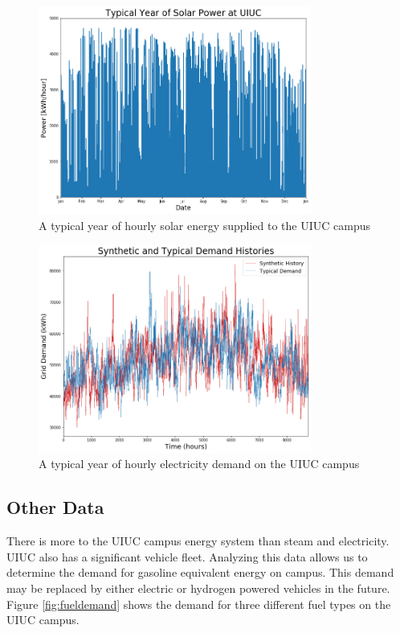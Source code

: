 \begin{figure}[H]
  \centering
  \includegraphics[width=0.8\textwidth]{typicalsolar}
  \caption{A typical year of hourly solar energy supplied to the UIUC campus}
  \label{fig:typsol}
\end{figure}


\begin{figure}[H]
  \centering
  \includegraphics[width=0.8\textwidth]{syntypdemand}
  \caption{A typical year of hourly electricity demand on the UIUC campus}
  \label{fig:synelc}
\end{figure}

\subsection{Other Data}
There is more to the UIUC campus energy system than steam and electricity. UIUC
also has a significant vehicle fleet. Analyzing this data allows us to determine
the demand for gasoline equivalent energy on campus. This demand may be replaced
by either electric or hydrogen powered vehicles in the future. Figure
\ref{fig:fueldemand} shows the demand for three different fuel types on the UIUC
campus.

